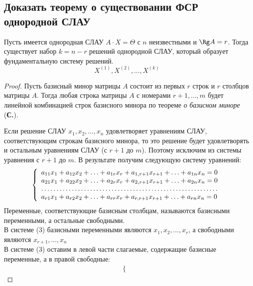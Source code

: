 \subsection{Доказать теорему о существовании ФСР однородной СЛАУ}
\begin{theorem*}
	Пусть имеется однородная СЛАУ $A\cdot X = \Theta$ с $n$ неизвестными и $\Rg A = r$. Тогда существует набор $k = n-r$ решений однородной СЛАУ, который образует фундаментальную систему решений.
	\[ X^{(1)},X^{(2)},\ldots,X^{(k)} \]
\end{theorem*}
\begin{proof}
	\hspace{0.6cm}Пусть базисный минор матрицы $A$ состоит из первых $r$ строк и $r$ столбцов матрицы $A$. Тогда любая строка матрицы $A$ с номерами $r+1,\ldots,m$ будет линейной комбинацией строк базисного минора по теореме \textit{о базисном миноре} (\textbf{С.\pageref{О базисном миноре}}). \par
	Если решение СЛАУ $x_1, x_2,\ldots, x_n$ удовлетворяет уравнениям СЛАУ, соответствующим строкам базисного минора, то это решение будет удовлетворять и остальным уравнениям СЛАУ (с $r+1$ до $m$). Поэтому исключим из системы уравнения с $r+1$ до $m$. В результате получим следующую систему уравнений:
	\begin{gather}
		\left\{ \begin{array}{l}
			a_{11}x_1 + a_{12}x_2 + \ldots + a_{1r}x_r + a_{1, r+1}x_{r+1} + \ldots + a_{1n}x_n = 0\\
			a_{21}x_1 + a_{22}x_2 + \ldots + a_{2r}x_r + a_{2, r+1}x_{r+1} + \ldots + a_{2n}x_n = 0\\
			\hdotsfor{1}\\
			a_{r1}x_1 + a_{r2}x_2 + \ldots + a_{rr}x_r + a_{r, r+1}x_{r+1} + \ldots + a_{rn}x_n = 0
		\end{array} \right.
	\end{gather}
	\hspace{0.6cm}Переменные, соответствующие базисным столбцам, называются базисными переменными, а остальные свободными.\\
	В системе (3) базисными переменными являются $x_1, x_2, \ldots, x_r$, а свободными являются $x_{r+1},\ldots, x_n$\\
	В системе (3) оставим в левой части слагаемые, содержащие базисные переменные, а в правой свободные:
	\begin{gather}
		\left\{ \begin{array}{l}

\end{array}
\end{gather}
\end{proof}
